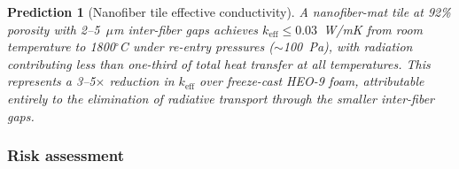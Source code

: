 \documentclass[12pt,letterpaper]{article}
\newtheorem{prediction}[theorem]{Prediction}
\theoremstyle{definition}
\begin{document}
\begin{prediction}[Nanofiber tile effective conductivity]\label{pred:nanofiber_keff}
A nanofiber-mat tile at 92\% porosity with 2--5~$\mu$m inter-fiber gaps achieves $k_{\mathrm{eff}} \leq 0.03$~W/mK from room temperature to 1800$^\circ$C under re-entry pressures ($\sim$100~Pa), with radiation contributing less than one-third of total heat transfer at all temperatures.  This represents a 3--5$\times$ reduction in $k_{\mathrm{eff}}$ over freeze-cast HEO-9 foam, attributable entirely to the elimination of radiative transport through the smaller inter-fiber gaps.
\end{prediction}

\subsubsection{Risk assessment}
\end{document}
